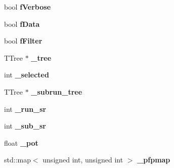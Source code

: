 \begin{DoxyCompactItemize}
\item 
bool {\bfseries f\+Verbose}\hypertarget{classNeutrinoSelectionFilter_a6a84ae73d6bc22d7f75de1750476f53a}{}\label{classNeutrinoSelectionFilter_a6a84ae73d6bc22d7f75de1750476f53a}

\item 
bool {\bfseries f\+Data}\hypertarget{classNeutrinoSelectionFilter_a892272d67c27d81277fc16bc48ab451d}{}\label{classNeutrinoSelectionFilter_a892272d67c27d81277fc16bc48ab451d}

\item 
bool {\bfseries f\+Filter}\hypertarget{classNeutrinoSelectionFilter_ae8811aa168d2e336c75e980a4dd2a2b8}{}\label{classNeutrinoSelectionFilter_ae8811aa168d2e336c75e980a4dd2a2b8}

\item 
T\+Tree $\ast$ {\bfseries \+\_\+tree}\hypertarget{classNeutrinoSelectionFilter_a4489c5bb4d7c9ff3002627bf6a4c28aa}{}\label{classNeutrinoSelectionFilter_a4489c5bb4d7c9ff3002627bf6a4c28aa}

\item 
int {\bfseries \+\_\+selected}\hypertarget{classNeutrinoSelectionFilter_a50c00840d977534f08a8405d3b6db8a7}{}\label{classNeutrinoSelectionFilter_a50c00840d977534f08a8405d3b6db8a7}

\item 
T\+Tree $\ast$ {\bfseries \+\_\+subrun\+\_\+tree}\hypertarget{classNeutrinoSelectionFilter_a6fd2c4dbb3f1d6b4f618bde415bb10a6}{}\label{classNeutrinoSelectionFilter_a6fd2c4dbb3f1d6b4f618bde415bb10a6}

\item 
int {\bfseries \+\_\+run\+\_\+sr}\hypertarget{classNeutrinoSelectionFilter_a057d305cb1ca799934c803b25f95ba33}{}\label{classNeutrinoSelectionFilter_a057d305cb1ca799934c803b25f95ba33}

\item 
int {\bfseries \+\_\+sub\+\_\+sr}\hypertarget{classNeutrinoSelectionFilter_a67a30e788850a2ad92f084403b654e46}{}\label{classNeutrinoSelectionFilter_a67a30e788850a2ad92f084403b654e46}

\item 
float {\bfseries \+\_\+pot}\hypertarget{classNeutrinoSelectionFilter_ab1d8bff6417f53e7fcaaad1762d09c23}{}\label{classNeutrinoSelectionFilter_ab1d8bff6417f53e7fcaaad1762d09c23}

\item 
std\+::map$<$ unsigned int, unsigned int $>$ {\bfseries \+\_\+pfpmap}\hypertarget{classNeutrinoSelectionFilter_a151658388ac5141bb8f1925dbf056bb7}{}\label{classNeutrinoSelectionFilter_a151658388ac5141bb8f1925dbf056bb7}


\end{DoxyCompactItemize}
